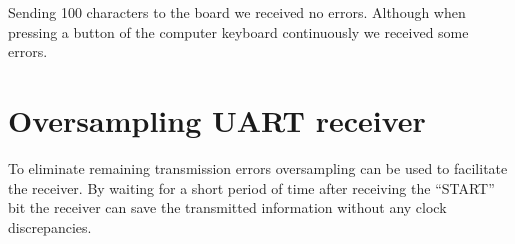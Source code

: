 

Sending 100 characters to the board we received no errors. Although when pressing a button of the computer keyboard continuously we received some errors.


\section{Oversampling UART receiver}

To eliminate remaining transmission errors oversampling can be used to facilitate the receiver. By waiting for a short period of time after receiving the ``START'' bit the receiver can save the transmitted information without any clock discrepancies.





